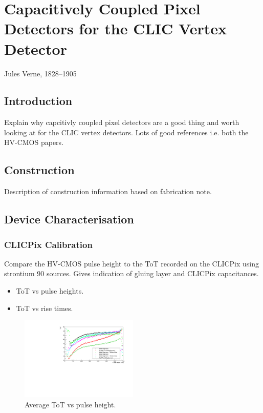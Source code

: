 \chapter{Capacitively Coupled Pixel Detectors for the CLIC Vertex Detector}
\label{chap:theory}

{Jules Verne, 1828--1905}

\section{Introduction}
Explain why capcitivly coupled pixel detectors are a good thing and worth looking at for the CLIC vertex detectors.  Lots of good references i.e. both the HV-CMOS papers.

\section{Construction}
Description of construction information based on fabrication note.

\section{Device Characterisation}

\subsection{CLICPix Calibration}
Compare the HV-CMOS pulse height to the ToT recorded on the CLICPix using strontium 90 sources.  Gives indication of gluing layer and CLICPix capacitances.  

\begin{itemize}
\item ToT vs pulse heights.  
\item ToT vs rise times.  
\end{itemize}

\begin{figure}
\centering
\includegraphics[width=0.5\textwidth]{CLICdpVertex/Plots/TargetToT_vs_PulseHeight.pdf}
\caption[Average ToT vs pulse height.]{Average ToT vs pulse height.}
\label{fig:avgtotvspulseheight}
\end{figure}

